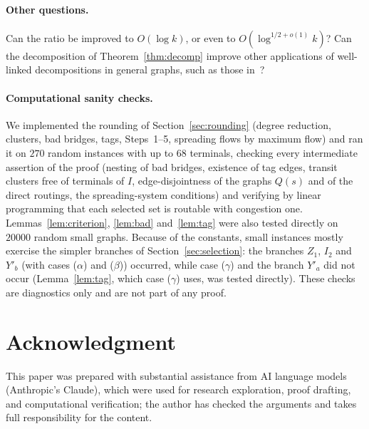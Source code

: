 \documentclass[11pt,letterpaper]{article}
\theoremstyle{definition}
\begin{document}
\paragraph{Other questions.}
Can the ratio be improved to $O(\log k)$, or even to $O(\log^{1/2+o(1)}k)$? Can the
decomposition of Theorem~\ref{thm:decomp} improve other applications of well-linked
decompositions in general graphs, such as those in~\cite{CL16}?

\paragraph{Computational sanity checks.}
We implemented the rounding of Section~\ref{sec:rounding} (degree reduction, clusters, bad
bridges, tags, Steps~1--5, spreading flows by maximum flow) and ran it on $270$ random instances
with up to $68$ terminals, checking every intermediate assertion of the proof (nesting of bad bridges,
existence of tag edges, transit clusters free of terminals of $I$, edge-disjointness of the
graphs $Q(s)$ and of the direct routings, the spreading-system conditions) and verifying by linear
programming that each selected set is routable with congestion one. Lemmas~\ref{lem:criterion},
\ref{lem:bad} and~\ref{lem:tag} were also tested directly on $20000$ random small graphs. Because
of the constants, small instances mostly exercise the simpler branches of
Section~\ref{sec:selection}: the branches $Z_1$, $I_2$ and $Y'_b$ (with cases ($\alpha$) and
($\beta$)) occurred, while case ($\gamma$) and the branch $Y'_a$ did not occur (Lemma~\ref{lem:tag},
which case ($\gamma$) uses, was tested directly). These checks are diagnostics only and are not part of any
proof.

\section*{Acknowledgment}
This paper was prepared with substantial assistance from AI language models (Anthropic's
Claude), which were used for research exploration, proof drafting, and computational
verification; the author has checked the arguments and takes full responsibility for the
content.



\end{document}
